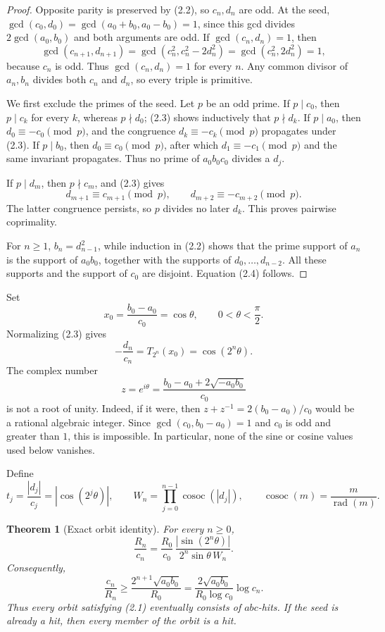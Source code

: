\documentclass[11pt]{article}
\newtheorem{theorem}{Theorem}
\theoremstyle{remark}
\newcommand{\rad}{\operatorname{rad}}
\newcommand{\cosoc}{\operatorname{cosoc}}
\begin{document}
\begin{proof}
Opposite parity is preserved by (2.2), so \(c_n,d_n\) are odd.  At the
seed,
\(\gcd(c_0,d_0)=\gcd(a_0+b_0,a_0-b_0)=1\), since this gcd divides
\(2\gcd(a_0,b_0)\) and both arguments are odd.  If
\(\gcd(c_n,d_n)=1\), then
\[
 \gcd(c_{n+1},d_{n+1})
 =\gcd(c_n^2,c_n^2-2d_n^2)
 =\gcd(c_n^2,2d_n^2)=1,
\]
because \(c_n\) is odd.  Thus \(\gcd(c_n,d_n)=1\) for every \(n\).
Any common divisor of \(a_n,b_n\) divides both \(c_n\) and \(d_n\), so
every triple is primitive.

We first exclude the primes of the seed.  Let \(p\) be an odd prime.
If \(p\mid c_0\), then \(p\mid c_k\) for every \(k\), whereas
\(p\nmid d_0\); (2.3) shows inductively that \(p\nmid d_k\).  If
\(p\mid a_0\), then \(d_0\equiv-c_0\pmod p\), and the congruence
\(d_k\equiv-c_k\pmod p\) propagates under (2.3).  If \(p\mid b_0\),
then \(d_0\equiv c_0\pmod p\), after which
\(d_1\equiv-c_1\pmod p\) and the same invariant propagates.  Thus no
prime of \(a_0b_0c_0\) divides a \(d_j\).

If \(p\mid d_m\), then \(p\nmid c_m\), and (2.3) gives
\[
 d_{m+1}\equiv c_{m+1}\pmod p,\qquad
 d_{m+2}\equiv-c_{m+2}\pmod p.
\]
The latter congruence persists, so \(p\) divides no later \(d_k\).
This proves pairwise coprimality.

For \(n\geq1\), \(b_n=d_{n-1}^2\), while induction in (2.2) shows that
the prime support of \(a_n\) is the support of \(a_0b_0\), together
with the supports of \(d_0,\ldots,d_{n-2}\).  All these supports and
the support of \(c_0\) are disjoint.  Equation (2.4) follows.
\end{proof}

Set
\[
 x_0=\frac{b_0-a_0}{c_0}=\cos\theta,\qquad
 0<\theta<\frac{\pi}{2}.
\]
Normalizing (2.3) gives
\[
 -\frac{d_n}{c_n}=T_{2^n}(x_0)=\cos(2^n\theta).            \tag{2.5}
\]
The complex number
\[
 z=e^{i\theta}
   =\frac{b_0-a_0+2\sqrt{-a_0b_0}}{c_0}                  \tag{2.6}
\]
is not a root of unity.  Indeed, if it were, then
\(z+z^{-1}=2(b_0-a_0)/c_0\) would be a rational algebraic integer.
Since \(\gcd(c_0,b_0-a_0)=1\) and \(c_0\) is odd and greater than \(1\),
this is impossible.  In particular, none of the sine or cosine values
used below vanishes.

Define
\[
 t_j=\frac{|d_j|}{c_j}=|\cos(2^j\theta)|,\qquad
 W_n=\prod_{j=0}^{n-1}\cosoc(|d_j|),\qquad
 \cosoc(m)=\frac{m}{\rad(m)}.                             \tag{2.7}
\]

\begin{theorem}[Exact orbit identity]\label{thm:exact}
For every \(n\geq0\),
\[
 \boxed{\quad
 \frac{R_n}{c_n}
 =\frac{R_0}{c_0}\,
   \frac{|\sin(2^n\theta)|}
        {2^n\sin\theta\,W_n}.
 \quad}                                                    \tag{2.8}
\]
Consequently,
\[
 \frac{c_n}{R_n}
 \geq\frac{2^{n+1}\sqrt{a_0b_0}}{R_0}
 =\frac{2\sqrt{a_0b_0}}{R_0\log c_0}\log c_n.             \tag{2.9}
\]
Thus every orbit satisfying (2.1) eventually consists of \(abc\)-hits.
If the seed is already a hit, then every member of the orbit is a hit.
\end{theorem}
\end{document}
